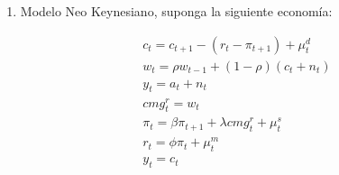 \documentclass[a4paper,12pt]{article}
\begin{document}
\begin{enumerate}
Por otro lado, la economía es la siguiente:
\\

\textbf{Banco Central}

\begin{equation*}
    M_2=(1+\mu)M_1
\end{equation*}

\textbf{Gobierno}

\begin{equation*}
    G_1=G_2=0
\end{equation*}

\textbf{Equilibrio}

\begin{equation*}
    Y=C_1=C_2
\end{equation*}

\begin{enumerate}[label=\alph*)]
\item Encuentre la demanda, oferta de dinero y equilibrio del mercado monetario. Anote todos los supuestos que considere necesarios. (\textbf{Ojo: verificar si las variables ya son nominales o reales})
\item ¿Qué ocurre si disminuye $\mu$?
\item ¿Qué ocurre si aumenta $\mu$?
\item ¿Qué ocurre si aumenta y?
\item Repita b),c) y d), pero ahora suponiendo que:
\begin{equation*}
    g_1= - \frac{b_2}{R}(1+\pi_2) + t_1 + m_1,
\end{equation*}
\begin{equation*}
        g_2= b_2- \frac{m_1}{(1+\pi_2)}  + m_2 + t_2,
\end{equation*}
donde: 

$g_1=g_2=0$.
\end{enumerate}

\newpage
    \item  Modelo Neo Keynesiano, suponga la siguiente economía:

\begin{gather}
c_t=c_{t+1} - (r_t- \pi_{t+1})+\mu_t^d\\[10pt]
w_t=\rho w_{t-1} + (1-\rho)(c_t + n_t)\\[10pt]
y_t=a_t+n_t\\[10pt]
cmg_t^r=w_t\\[10pt]
\pi_t=\beta \pi_{t+1}+\lambda cmg_t^r + \mu_t^s\\[10pt]
r_t=\phi \pi_t + \mu_t^m\\[10pt]
y_t=c_t
\end{gather}


\end{enumerate}
\end{document}
